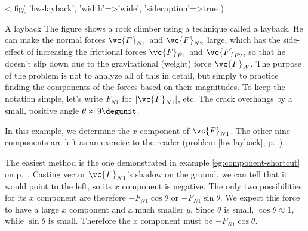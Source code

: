 <%
  fig(
    'hw-layback',
    {
      'width'=>'wide',
      'sidecaption'=>true
    }
  )

\begin{eg}{A layback}\label{eg:layback}
The figure shows a rock climber 
using a technique called a layback. He can make the normal forces
$\vc{F}_{N1}$ and $\vc{F}_{N2}$ large, which has the side-effect of increasing
the frictional forces $\vc{F}_{F1}$ and $\vc{F}_{F2}$, so that he doesn't slip
down due to the gravitational (weight) force $\vc{F}_W$. The purpose of the
problem is not to analyze all of this in detail, but simply to practice
finding the components of the forces based on their magnitudes.
To keep the notation simple, let's write $F_{N1}$ for 
$|\vc{F}_{N1}|$, etc. The crack overhangs by a small, positive angle $\theta\approx9\degunit$.

In this example, we 
 determine the
$x$ component of $\vc{F}_{N1}$. The other nine components are left as an exercise to
the reader (problem \ref{hw:layback}, p.~\pageref{hw:layback}).

The easiest method is the one demonstrated in example \ref{eg:component-shortcut}
on p.~\pageref{eg:component-shortcut}. Casting vector $\vc{F}_{N1}$'s shadow on the ground,
we can tell that it would point to the left, so its $x$ component is
negative. The only two possibilities for its $x$ component are therefore
$-F_{N1}\cos\theta$ or $-F_{N1}\sin\theta$. We expect this force to have
a large $x$ component and a much smaller $y$. Since $\theta$ is small,
$\cos\theta\approx 1$, while $\sin\theta$ is small. Therefore
the $x$ component must be $-F_{N1}\cos\theta$.
\end{eg}

